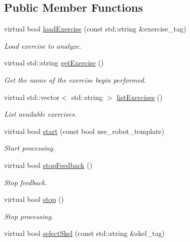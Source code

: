 \subsection*{Public Member Functions}
\begin{DoxyCompactItemize}
\item 
virtual bool \hyperlink{classmotionAnalyzer__IDL_a656d8a9edd690c651cb1079cfa697c10}{load\+Exercise} (const std\+::string \&exercise\+\_\+tag)
\begin{DoxyCompactList}\small\item\em Load exercise to analyze. \end{DoxyCompactList}\item 
virtual std\+::string \hyperlink{classmotionAnalyzer__IDL_a7e2b015cc7bd121d789e33980505f630}{get\+Exercise} ()
\begin{DoxyCompactList}\small\item\em Get the name of the exercise begin performed. \end{DoxyCompactList}\item 
virtual std\+::vector$<$ std\+::string $>$ \hyperlink{classmotionAnalyzer__IDL_ac62e7b2af278d353c3701d87aca8af2b}{list\+Exercises} ()
\begin{DoxyCompactList}\small\item\em List available exercises. \end{DoxyCompactList}\item 
virtual bool \hyperlink{classmotionAnalyzer__IDL_aeebeafd8986b78e720eb1c6eba09207e}{start} (const bool use\+\_\+robot\+\_\+template)
\begin{DoxyCompactList}\small\item\em Start processing. \end{DoxyCompactList}\item 
virtual bool \hyperlink{classmotionAnalyzer__IDL_a6753e9b8772e76ed6fbb4d39616f1423}{stop\+Feedback} ()
\begin{DoxyCompactList}\small\item\em Stop feedback. \end{DoxyCompactList}\item 
virtual bool \hyperlink{classmotionAnalyzer__IDL_affddad47070a4fdb10357c10037f39f5}{stop} ()
\begin{DoxyCompactList}\small\item\em Stop processing. \end{DoxyCompactList}\item 
virtual bool \hyperlink{classmotionAnalyzer__IDL_a158f8a856611aa5d4bcab9adc9c67a5d}{select\+Skel} (const std\+::string \&skel\+\_\+tag)

\end{DoxyCompactItemize}
